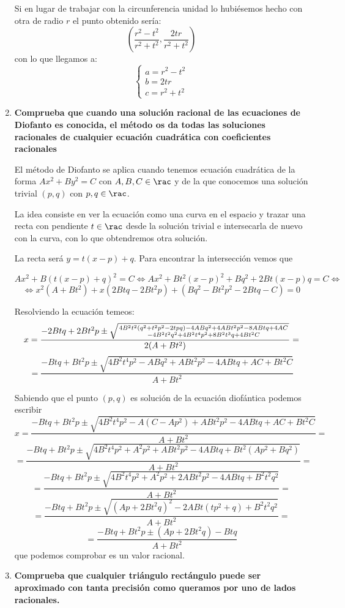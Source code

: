 \begin{problem}[9]
\begin{enumerate}
Si en lugar de trabajar con la circunferencia unidad lo hubiésemos hecho con otra de radio $r$ el punto obtenido sería:
\[\left(\frac{r^2-t^2}{r^2+t^2}, \frac{2tr}{r^2+t^2}\right)\]
con lo que llegamos a:
\[\left\{\begin{array}{l}
a=r^2-t^2 \\
b=2tr\\
c=r^2+t^2
\end{array}\right.\]

\item \textbf{Comprueba que cuando una solución racional de las ecuaciones de Diofanto es conocida, el método os da todas las soluciones racionales de cualquier ecuación cuadrática con coeficientes racionales}

El método de Diofanto se aplica cuando tenemos ecuación cuadrática de la forma $Ax^2+By^2=C$ con $A,B,C \in \rac$ y de la que conocemos una solución trivial $(p,q)$ con $p,q \in \rac$.

La idea consiste en ver la ecuación como una curva en el espacio y trazar una recta con pendiente $t \in \rac$ desde la solución trivial e intersecarla de nuevo con la curva, con lo que obtendremos otra solución.

La recta será $y=t(x-p)+q$. Para encontrar la intersección vemos que

\[Ax^2 + B\left(t(x-p)+q\right)^2 = C \iff Ax^2+Bt^2(x-p)^2 +Bq^2+2Bt(x-p)q=C \iff\]
\[\iff x^2 (A+Bt^2) + x (2Btq-2Bt^2p) + \left(Bq^2-Bt^2p^2-2Btq-C\right) = 0\]

Resolviendo la ecuación temeos:
\[x= \frac{-2Btq+2Bt^2p \pm \sqrt{4B^2t^2(q^2+t^2p^2-2tpq)-4ABq^2+4ABt^2p^2-8ABtq+4AC\atop -4B^2t^2q^2+4B^2t^4p^2+8B^2t^3q+4Bt^2C}}{2(A+Bt^2)}=\]
\[=\frac{-Btq+Bt^2p \pm \sqrt{4B^2t^4p^2-ABq^2+ABt^2p^2-4ABtq+AC +Bt^2C}}{A+Bt^2}\]

Sabiendo que el punto $(p,q)$ es solución de la ecuación diofántica podemos escribir
\[x=\frac{-Btq+Bt^2p \pm \sqrt{4B^2t^4p^2-A(C-Ap^2)+ABt^2p^2-4ABtq+AC +Bt^2C}}{A+Bt^2}=\]
\[=\frac{-Btq+Bt^2p \pm \sqrt{4B^2t^4p^2+A^2p^2+ABt^2p^2-4ABtq +Bt^2(Ap^2+Bq^2)}}{A+Bt^2}=\]
\[=\frac{-Btq+Bt^2p \pm \sqrt{4B^2t^4p^2+A^2p^2+2ABt^2p^2-4ABtq +B^2t^2q^2}}{A+Bt^2}=\]
\[=\frac{-Btq+Bt^2p \pm \sqrt{(Ap+2Bt^2q)^2-2ABt(tp^2+q)+B^2t^2q^2}}{A+Bt^2}=\]
\[=\frac{-Btq+Bt^2p \pm (Ap+2Bt^2q)-Btq}{A+Bt^2}\]
que podemos comprobar es un valor racional.


\item \textbf{Comprueba que cualquier triángulo rectángulo puede ser aproximado con tanta precisión como queramos por uno de lados racionales.}



\end{enumerate}


\end{problem}

